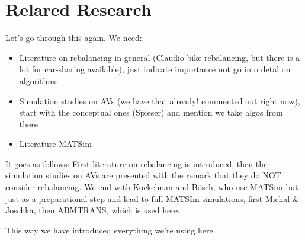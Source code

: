 \section{Relared Research}
\label{subs:literatureResearch}

Let's go through this again. We need:

\begin{itemize}
\item Literature on rebalancing in general (Claudio bike rebalancing, but there is a lot for car-sharing available), just indicate importance not go into detal on algorithms
\item Simulation studies on AVs (we have that already! commented out right now), start with the conceptual ones (Spieser) and mention we take algos from there
\item Literature MATSim
\end{itemize}

It goes as follows: First literature on rebalancing is introduced, then the simulation studies on AVs
are presented with the remark that they do NOT consider rebalancing. We end with Kockelman and Bösch,
who use MATSim but just as a preparational step and lead to full MATSIm simulations, first Michal & Joschka,
then ABMTRANS, which is used here.

This way we have introduced everything we're using here.


